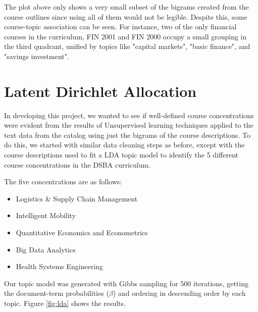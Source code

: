 The plot above only shows a very small subset of the bigrams created from the course outlines since using all of them would not be legible.  Despite this,  some course-topic association can be seen.  For instance, two of the only financial courses in the curriculum, FIN 2001 and FIN 2000 occupy a small grouping in the third quadrant, unified by topics like "capital markets", "basic finance", and "savings investment". 

\section{Latent Dirichlet Allocation}

In developing this project, we wanted to see if well-defined course concentrations were evident from the results of Unsupervised learning techniques applied to the text data from the catalog using just the bigrams of the course descriptions.  To do this,  we started with similar data cleaning steps as before, except with the course descriptions used to fit a LDA \cite{lda_pap} topic model to identify the 5 different course concentrations in the DSBA curriculum. 

The five concentrations are as follows:   
\begin{itemize}
	\item{Logistics \& Supply Chain Management }
	\item{Intelligent Mobility}
	\item{Quantitative Economics and Econometrics}
	\item{Big Data Analytics}
	\item{Health Systems Engineering}

\end{itemize}

Our topic model was generated with Gibbs sampling for 500 iterations,  getting the document-term probabilities ($\beta$) and ordering in descending order by each topic. Figure \ref{fig:lda} shows the results.


